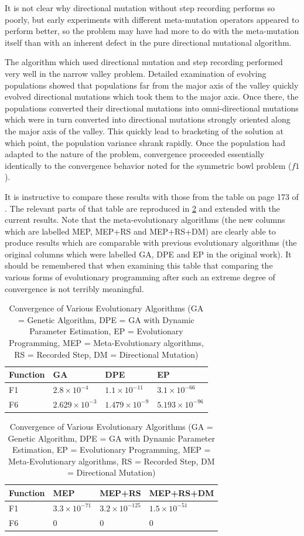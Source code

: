 \documentclass[12pt, titlepage]{article}
\begin{document}
It is not clear why directional mutation without step recording
performs so poorly, but early experiments with different meta-mutation
operators appeared to perform better, so the problem may have had more
to do with the meta-mutation itself than with an inherent defect in
the pure directional mutational algorithm.

The algorithm which used directional mutation and step recording
performed very well in the narrow valley problem.  Detailed
examination of evolving populations showed that populations far from
the major axis of the valley quickly evolved directional mutations
which took them to the major axis.  Once there, the populations
converted their directional mutations into omni-directional mutations
which were in turn converted into directional mutations strongly
oriented along the major axis of the valley.  This quickly lead to
bracketing of the solution at which point, the population variance
shrank rapidly.  Once the population had adapted to the nature of the
problem, convergence proceeded essentially identically to the
convergence behavior noted for the symmetric bowl problem ($f1$).

It is instructive to compare these results with those from the table
on page 173 of \cite{fogel94}.  The relevant parts of that table are
reproduced in \ref{tab:t1} and extended with the current results.
Note that the meta-evolutionary algorithms (the new columns which are
labelled MEP, MEP+RS and MEP+RS+DM) are clearly able to produce
results which are comparable with previous evolutionary algorithms
(the original columns which were labelled GA, DPE and EP in the
original work).  It should be remembered that when examining this
table that comparing the various forms of evolutionary programming
after such an extreme degree of convergence is not terribly
meaningful.

\begin{table}[htb]
\begin{tabular}[]{|l|lll|}
\hline
Function & GA & DPE & EP \\ \hline
F1 & $2.8 \times 10^{-4}$ & $1.1 \times 10^{-11}$ & $3.1 \times 10^{-66}$ \\
F6 & $2.629 \times 10^{-3}$ & $1.479 \times 10^{-9}$ & $5.193 \times 10^{-96}$ \\
\hline
\end{tabular}
\begin{tabular}[]{|l|lll|}
\hline
Function & MEP & MEP+RS & MEP+RS+DM \\ \hline
F1 & $3.3 \times 10^{-71}$ & $3.2 \times 10^{-125}$ & $1.5 \times 10^{-51}$ \\
F6 & $0$ & $0$ & $0$ \\
\hline
\end{tabular}
\caption{Convergence of Various Evolutionary Algorithms
(GA = Genetic Algorithm, DPE = GA with Dynamic Parameter Estimation, EP
= Evolutionary Programming, MEP = Meta-Evolutionary algorithms, RS =
Recorded Step, DM = Directional Mutation)}\label{tab:t1}
\end{table}
\end{document}
